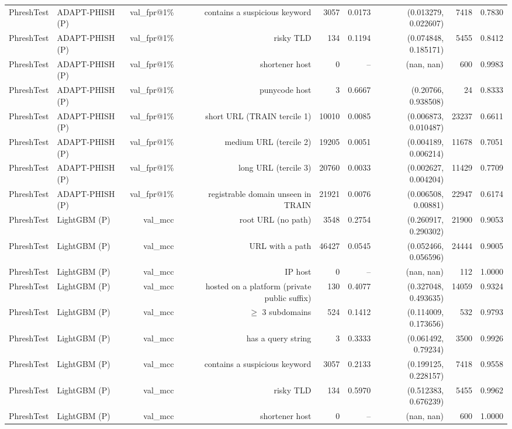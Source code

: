 \begin{table}[t]
\begin{tabular}{llrrrrrrr}
PhreshTest & ADAPT-PHISH (P) & val\_fpr@1\% & contains a suspicious keyword & 3057 & 0.0173 & (0.013279, 0.022607) & 7418 & 0.7830 \\
PhreshTest & ADAPT-PHISH (P) & val\_fpr@1\% & risky TLD & 134 & 0.1194 & (0.074848, 0.185171) & 5455 & 0.8412 \\
PhreshTest & ADAPT-PHISH (P) & val\_fpr@1\% & shortener host & 0 & -- & (nan, nan) & 600 & 0.9983 \\
PhreshTest & ADAPT-PHISH (P) & val\_fpr@1\% & punycode host & 3 & 0.6667 & (0.20766, 0.938508) & 24 & 0.8333 \\
PhreshTest & ADAPT-PHISH (P) & val\_fpr@1\% & short URL (TRAIN tercile 1) & 10010 & 0.0085 & (0.006873, 0.010487) & 23237 & 0.6611 \\
PhreshTest & ADAPT-PHISH (P) & val\_fpr@1\% & medium URL (tercile 2) & 19205 & 0.0051 & (0.004189, 0.006214) & 11678 & 0.7051 \\
PhreshTest & ADAPT-PHISH (P) & val\_fpr@1\% & long URL (tercile 3) & 20760 & 0.0033 & (0.002627, 0.004204) & 11429 & 0.7709 \\
PhreshTest & ADAPT-PHISH (P) & val\_fpr@1\% & registrable domain unseen in TRAIN & 21921 & 0.0076 & (0.006508, 0.00881) & 22947 & 0.6174 \\
PhreshTest & LightGBM (P) & val\_mcc & root URL (no path) & 3548 & 0.2754 & (0.260917, 0.290302) & 21900 & 0.9053 \\
PhreshTest & LightGBM (P) & val\_mcc & URL with a path & 46427 & 0.0545 & (0.052466, 0.056596) & 24444 & 0.9005 \\
PhreshTest & LightGBM (P) & val\_mcc & IP host & 0 & -- & (nan, nan) & 112 & 1.0000 \\
PhreshTest & LightGBM (P) & val\_mcc & hosted on a platform (private public suffix) & 130 & 0.4077 & (0.327048, 0.493635) & 14059 & 0.9324 \\
PhreshTest & LightGBM (P) & val\_mcc & $\geq$ 3 subdomains & 524 & 0.1412 & (0.114009, 0.173656) & 532 & 0.9793 \\
PhreshTest & LightGBM (P) & val\_mcc & has a query string & 3 & 0.3333 & (0.061492, 0.79234) & 3500 & 0.9926 \\
PhreshTest & LightGBM (P) & val\_mcc & contains a suspicious keyword & 3057 & 0.2133 & (0.199125, 0.228157) & 7418 & 0.9558 \\
PhreshTest & LightGBM (P) & val\_mcc & risky TLD & 134 & 0.5970 & (0.512383, 0.676239) & 5455 & 0.9962 \\
PhreshTest & LightGBM (P) & val\_mcc & shortener host & 0 & -- & (nan, nan) & 600 & 1.0000 \\

\end{tabular}
\end{table}
